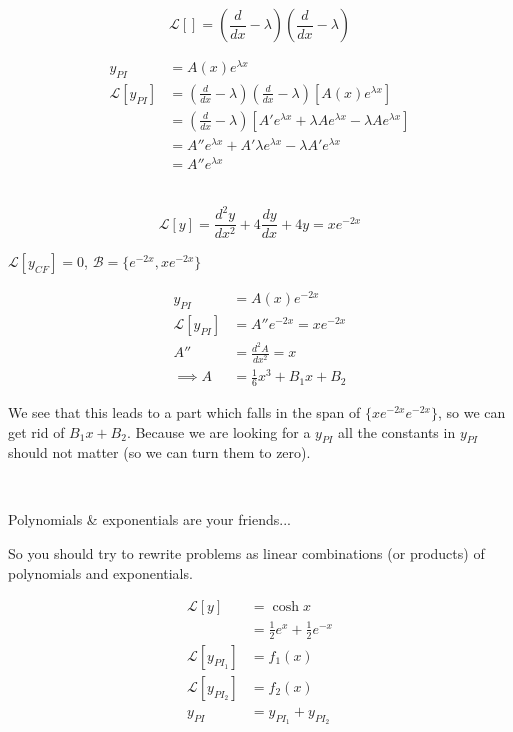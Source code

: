\documentclass[twoside]{scrartcl}
\begin{document}

\[\mathcal{L}[] = \left(\frac{d}{dx} -\lambda\right)\left(\frac{d}{dx} -\lambda\right)\]

\[
\begin{aligned}
  y_{PI} &= A(x)e^{\lambda x}\\
  \mathcal{L}[y_{PI}] &= \left(\frac{d}{dx}-\lambda\right)\left(\frac{d}{dx}-\lambda\right)[A(x)e^{\lambda x}]\\
  &= \left(\frac{d}{dx}-\lambda\right)[A'e^{\lambda x}+\lambda Ae^{\lambda x}-\lambda Ae^{\lambda x}]\\
  &= A''e^{\lambda x}+A'\lambda e^{\lambda x}-\lambda A'e^{\lambda x}\\
  &= A''e^{\lambda x}
\end{aligned}
\]~

\begin{example}
\[\mathcal{L}[y] = \frac{d^2y}{dx^2}+4\frac{dy}{dx}+4y = xe^{-2x}\]	

$\mathcal{L}[y_{CF}] = 0$, $\mathcal{B} = \{e^{-2x},xe^{-2x}\}$

\[
\begin{aligned}
  y_{PI} &= A(x)e^{-2x}\\
  \mathcal{L}[y_{PI}] &= A''e^{-2x} = xe^{-2x}\\
  A'' &= \frac{d^2A}{dx^2} = x\\
  \implies A &= \frac{1}{6}x^3 + B_1x + B_2
\end{aligned}
\]

We see that this leads to a part which falls in the span of $\{xe^{-2x} e^{-2x}\}$, so we can get rid of $B_1x + B_2$. Because we are looking for a $y_{PI}$ all the constants in $y_{PI}$ should not matter (so we can turn them to zero). 
\end{example}~

\begin{theorem}
Polynomials \& exponentials are your friends...	\end{theorem}
So you should try to rewrite problems as linear combinations (or products) of polynomials and exponentials.\\

\begin{example}
	\[
\begin{aligned}
  \mathcal{L}[y] &= \cosh x\\
  &= \frac{1}{2}e^x + \frac{1}{2}e^{-x}\\
  \mathcal{L}[y_{PI_1}] &= f_1(x)\\
  \mathcal{L}[y_{PI_2}] &= f_2(x)\\
  y_{PI} &= y_{PI_1} + y_{PI_2}
\end{aligned}
\]
\end{example}~\vspace*{5pt}
\end{document}
